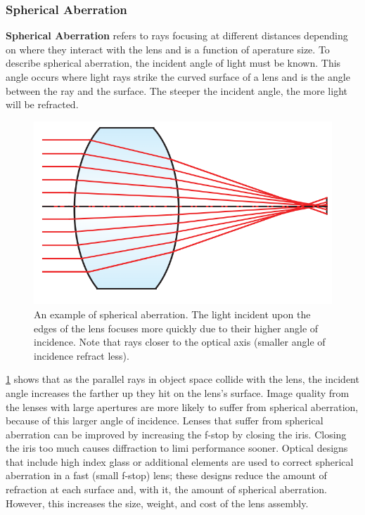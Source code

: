 \documentclass[10pt]{article}
\begin{document}
\begin{multicols}{2}
\subsubsection{Spherical Aberration}
\textbf{Spherical Aberration} refers to rays focusing at different distances depending on where they interact with the lens and is a function of aperature size. To describe spherical aberration, the incident angle of light must be known. This angle occurs where light rays strike the curved surface of a lens and is the angle between the ray and the surface. The steeper the incident angle, the more light will be refracted.
\begin{figure}[H]
    \centering
    \includegraphics[width=0.8\linewidth]{Images/Week 1/spherical-abberation.png}
    \caption{An example of spherical aberration. The light incident upon the edges of the lens focuses more quickly due to their higher angle of incidence. Note that rays closer to the optical axis (smaller angle of incidence refract less).}
    \label{fig:spherical-aberration}
\end{figure}
\ref{fig:spherical-aberration} shows that as the parallel rays in object space collide with the lens, the incident angle increases the farther up they hit on the lens's surface. Image quality from the lenses with large apertures are more likely to suffer from spherical aberration, because of this larger angle of incidence. Lenses that suffer from spherical aberration can be improved by increasing the f-stop by closing the iris. Closing the iris too much causes diffraction to limi performance sooner. Optical designs that include high index glass or additional elements are used to correct spherical aberration in a fast (small f-stop) lens; these designs reduce the amount of refraction at each surface and, with it, the amount of spherical aberration. However, this increases the size, weight, and cost of the lens assembly.
\newline \newline

\end{multicols}
\end{document}
